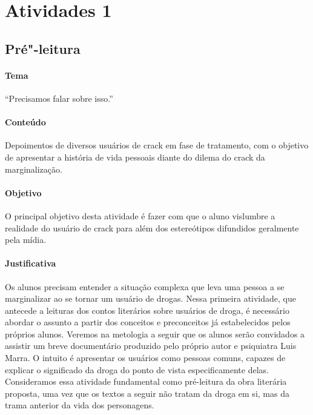 \documentclass[11pt]{extarticle}
\begin{document}
\tableofcontents


\section{Atividades 1}


\subsection{Pré"-leitura}


\paragraph{Tema} ``Precisamos falar sobre isso.'' 

\paragraph{Conteúdo} Depoimentos de diversos usuários de crack em 
fase de tratamento, com o objetivo de apresentar a história de 
vida pessoais diante do dilema do crack da marginalização. 

\paragraph{Objetivo} O principal objetivo desta atividade 
é fazer com que o aluno vislumbre a realidade do usuário de 
crack para além dos estereótipos difundidos geralmente 
pela mídia. 

\paragraph{Justificativa} Os alunos precisam 
entender a situação complexa que leva uma pessoa a se marginalizar 
ao se tornar um usuário de drogas. 
Nessa primeira atividade, 
que antecede a leituras dos contos literários sobre usuários de droga, 
é necessário abordar o assunto a partir dos conceitos e
preconceitos já estabelecidos pelos próprios alunos. 
Veremos na metologia a seguir que os alunos serão 
convidados a assistir um breve documentário produzido pelo 
próprio autor e psiquiatra Luis Marra. O intuito é apresentar 
os usuários como pessoas comuns, capazes de explicar o significado da droga 
do ponto de vista especificamente delas. Consideramos essa 
atividade fundamental como pré-leitura da obra literária proposta, uma vez que 
os textos a seguir não tratam da droga em si, mas 
da trama anterior da vida dos personagens. 
\end{document}
